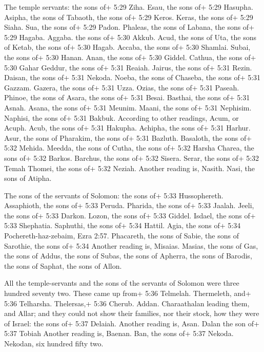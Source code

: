  The temple servants: the sons of+ 5:29 Ziha. Esau, the
sons of+ 5:29 Hasupha. Asipha, the sons of Tabaoth, the sons of+ 5:29
Keros. Keras, the sons of+ 5:29 Siaha. Sua, the sons of+ 5:29 Padon.
Phaleas, the sons of Labana, the sons of+ 5:29 Hagaba. Aggaba.
 the sons of+ 5:30 Akkub. Acud, the sons of Uta, the sons
of Ketab, the sons of+ 5:30 Hagab. Accaba, the sons of+ 5:30 Shamlai.
Subai, the sons of+ 5:30 Hanan. Anan, the sons of+ 5:30 Giddel. Cathua,
the sons of+ 5:30 Gahar Geddur,  the sons of+ 5:31 Reaiah.
Jairus, the sons of+ 5:31 Rezin. Daisan, the sons of+ 5:31 Nekoda.
Noeba, the sons of Chaseba, the sons of+ 5:31 Gazzam. Gazera, the sons
of+ 5:31 Uzza. Ozias, the sons of+ 5:31 Paseah. Phinoe, the sons of
Asara, the sons of+ 5:31 Besai. Basthai, the sons of+ 5:31 Asnah. Asana,
the sons of+ 5:31 Meunim. Maani, the sons of+ 5:31 Nephisim. Naphisi,
the sons of+ 5:31 Bakbuk. According to other readings, Acum, or Acuph.
Acub, the sons of+ 5:31 Hakupha. Achipha, the sons of+ 5:31 Harhur.
Asur, the sons of Pharakim, the sons of+ 5:31 Bazluth. Basaloth,
 the sons of+ 5:32 Mehida. Meedda, the sons of Cutha, the
sons of+ 5:32 Harsha Charea, the sons of+ 5:32 Barkos. Barchus, the sons
of+ 5:32 Sisera. Serar, the sons of+ 5:32 Temah Thomei, the sons of+
5:32 Neziah. Another reading is, Nasith. Nasi, the sons of Atipha.

 The sons of the servants of Solomon: the sons of+ 5:33
Hussophereth. Assaphioth, the sons of+ 5:33 Peruda. Pharida, the sons
of+ 5:33 Jaalah. Jeeli, the sons of+ 5:33 Darkon. Lozon, the sons of+
5:33 Giddel. Isdael, the sons of+ 5:33 Shephatia. Saphuthi,
 the sons of+ 5:34 Hattil. Agia, the sons of+ 5:34
Pochereth-haz-zebaim, Ezra 2:57. Phacareth, the sons of Sabie, the sons
of Sarothie, the sons of+ 5:34 Another reading is, Misaias. Masias, the
sons of Gas, the sons of Addus, the sons of Subas, the sons of Apherra,
the sons of Barodis, the sons of Saphat, the sons of Allon.

 All the temple-servants and the sons of the servants of
Solomon were three hundred seventy two.  These came up
from+ 5:36 Telmelah. Thermeleth, and+ 5:36 Telharsha. Thelersas,+ 5:36
Cherub. Addan. Charaathalan leading them, and Allar;  and
they could not show their families, nor their stock, how they were of
Israel: the sons of+ 5:37 Delaiah. Another reading is, Asan. Dalan the
son of+ 5:37 Tobiah Another reading is, Baenan. Ban, the sons of+ 5:37
Nekoda. Nekodan, six hundred fifty two.

